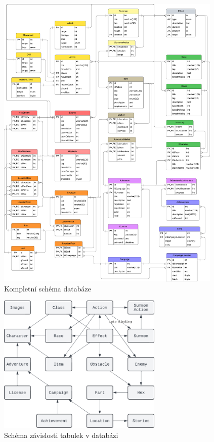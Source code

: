\begin{figure}[H]
    \centering
    \includegraphics[width=0.96\textwidth]{../../shared/diagrams/dbScheme}
    \caption{Kompletní schéma databáze}
    \label{fig:db_scheme}
\end{figure}

\begin{figure}[H]
    \centering
    \includegraphics[width=0.7\textwidth]{diagrams/databasePriority}
    \caption{Schéma závislosti tabulek v databázi}
    \label{fig:db_table_priority}
\end{figure}

